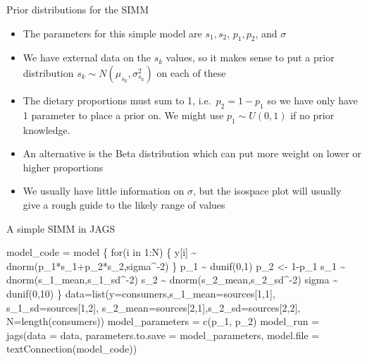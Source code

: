 \documentclass[
  ignorenonframetext,
  aspectratio=169]{beamer}
\newenvironment{Shaded}{\begin{snugshade}}{\end{snugshade}}
\newcommand{\AttributeTok}[1]{\textcolor[rgb]{0.77,0.63,0.00}{#1}}
\newcommand{\DecValTok}[1]{\textcolor[rgb]{0.00,0.00,0.81}{#1}}
\newcommand{\FunctionTok}[1]{\textcolor[rgb]{0.00,0.00,0.00}{#1}}
\newcommand{\NormalTok}[1]{#1}
\newcommand{\OtherTok}[1]{\textcolor[rgb]{0.56,0.35,0.01}{#1}}
\newcommand{\StringTok}[1]{\textcolor[rgb]{0.31,0.60,0.02}{#1}}
\providecommand{\tightlist}{%
  \setlength{\itemsep}{0pt}\setlength{\parskip}{0pt}}
\begin{document}
\begin{frame}{Prior distributions for the SIMM}
\protect\hypertarget{prior-distributions-for-the-simm}{}
\begin{itemize}
\tightlist
\item
  The parameters for this simple model are \(s_1,s_2\), \(p_1,p_2\), and
  \(\sigma\)
\item
  We have external data on the \(s_k\) values, so it makes sense to put
  a prior distribution \(s_k \sim N(\mu_{s_k},\sigma_{s_k}^2)\) on each
  of these
\item
  The dietary proportions must sum to 1, i.e.~\(p_2 = 1-p_1\) so we have
  only have 1 parameter to place a prior on. We might use
  \(p_1 \sim U(0,1)\) if no prior knowledge.
\item
  An alternative is the Beta distribution which can put more weight on
  lower or higher proportions
\item
  We usually have little information on \(\sigma\), but the isospace
  plot will usually give a rough guide to the likely range of values
\end{itemize}
\end{frame}

\begin{frame}[fragile]{A simple SIMM in JAGS}
\protect\hypertarget{a-simple-simm-in-jags}{}
\small

\begin{Shaded}
\begin{Highlighting}[]
\NormalTok{model\_code }\OtherTok{=}\StringTok{\textquotesingle{}}
\StringTok{model \{}
\StringTok{  for(i in 1:N) \{ }
\StringTok{    y[i] \textasciitilde{} dnorm(p\_1*s\_1+p\_2*s\_2,sigma\^{}{-}2) }
\StringTok{  \}}
\StringTok{  p\_1 \textasciitilde{} dunif(0,1)}
\StringTok{  p\_2 \textless{}{-} 1{-}p\_1}
\StringTok{  s\_1 \textasciitilde{} dnorm(s\_1\_mean,s\_1\_sd\^{}{-}2)}
\StringTok{  s\_2 \textasciitilde{} dnorm(s\_2\_mean,s\_2\_sd\^{}{-}2)}
\StringTok{  sigma \textasciitilde{} dunif(0,10)}
\StringTok{\}}
\StringTok{\textquotesingle{}}
\NormalTok{data}\OtherTok{=}\FunctionTok{list}\NormalTok{(}\AttributeTok{y=}\NormalTok{consumers,}\AttributeTok{s\_1\_mean=}\NormalTok{sources[}\DecValTok{1}\NormalTok{,}\DecValTok{1}\NormalTok{],}
          \AttributeTok{s\_1\_sd=}\NormalTok{sources[}\DecValTok{1}\NormalTok{,}\DecValTok{2}\NormalTok{],}
          \AttributeTok{s\_2\_mean=}\NormalTok{sources[}\DecValTok{2}\NormalTok{,}\DecValTok{1}\NormalTok{],}\AttributeTok{s\_2\_sd=}\NormalTok{sources[}\DecValTok{2}\NormalTok{,}\DecValTok{2}\NormalTok{],}
          \AttributeTok{N=}\FunctionTok{length}\NormalTok{(consumers))}
\NormalTok{model\_parameters }\OtherTok{=} \FunctionTok{c}\NormalTok{(}\StringTok{\textquotesingle{}p\_1\textquotesingle{}}\NormalTok{, }\StringTok{\textquotesingle{}p\_2\textquotesingle{}}\NormalTok{)}
\NormalTok{model\_run }\OtherTok{=} \FunctionTok{jags}\NormalTok{(}\AttributeTok{data =}\NormalTok{ data,}
                 \AttributeTok{parameters.to.save =}\NormalTok{ model\_parameters,}
                 \AttributeTok{model.file =} \FunctionTok{textConnection}\NormalTok{(model\_code))}
\end{Highlighting}
\end{Shaded}
\end{frame}
\end{document}
